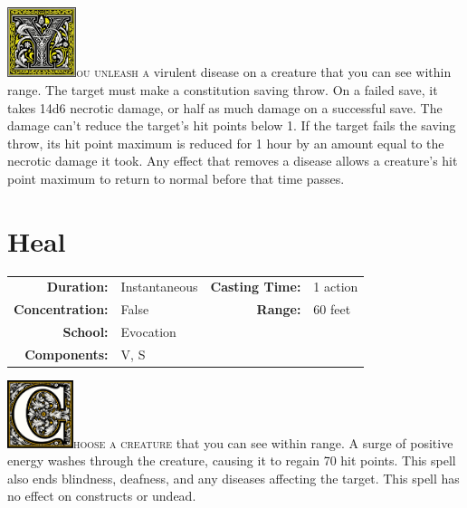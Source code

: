 \documentclass[12pt,showtrims]{memoir}
\begin{document}
\vspace{1\baselineskip}\noindent
\lettrine[lines=4]{\includegraphics[height=58pt]{initials/Y.png}}{ou unleash a} virulent disease on a creature that you can see within range. The target must make a constitution saving throw. On a failed save, it takes 14d6 necrotic damage, or half as much damage on a successful save. The damage can't reduce the target's hit points below 1. If the target fails the saving throw, its hit point maximum is reduced for 1 hour by an amount equal to the necrotic damage it took. Any effect that removes a disease allows a creature's hit point maximum to return to normal before that time passes.

\newpage
\section*{Heal}

{
\small\centering\vspace{-6pt}
\begin{tabular}{rlrl}
\toprule

\textbf{Duration:} & Instantaneous &
\textbf{Casting Time:} & 1 action \\
\textbf{Concentration:} & False &
\textbf{Range:} & 60 feet \\
\textbf{School:} & Evocation \\
\textbf{Components:} & \multicolumn{3}{p{0.7\textwidth}}{V, S}\\

\bottomrule
\end{tabular}
}

\vspace{1\baselineskip}\noindent
\lettrine[lines=4]{\includegraphics[height=56pt]{initials/C.png}}{hoose a creature} that you can see within range. A surge of positive energy washes through the creature, causing it to regain 70 hit points. This spell also ends blindness, deafness, and any diseases affecting the target. This spell has no effect on constructs or undead.
\end{document}
